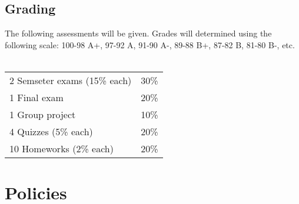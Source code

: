 \documentclass{article}
\begin{document}
\subsection{Grading}
  The following assessments will be given.  Grades will determined using the following scale: 100-98 A+, 97-92 A, 91-90 A-, 89-88 B+, 87-82 B, 81-80 B-, etc.\\ \\
\begin{tabular}{ll}
  2 Semseter exams (15\% each) & 30\% \\
  1 Final exam                 & 20\% \\
  1 Group project              & 10\% \\
  4 Quizzes (5\% each)         & 20\% \\
  10 Homeworks (2\% each)      & 20\% \\
\end{tabular}

\section {Policies}
\end{document}
